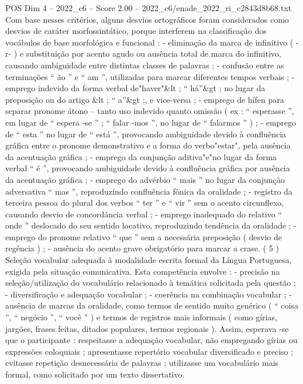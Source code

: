 \begin{textsample}{POS Dim 4 – 2022\_c6 – Score 2.00 – 2022\_c6/enade\_2022\_ri\_c2843d8b68.txt}
Com base nesses critérios, alguns desvios ortográficos foram considerados como desvios de caráter morfossintático, porque interferem na classificação dos vocábulos de base morfológica e funcional : - eliminação da marca de infinitivo ( -r- ) e substituição por acento agudo ou ausência total de marca do infinitivo, causando ambiguidade entre distintas classes de palavras ; - confusão entre as terminações “ ão ” e “ am ”, utilizadas para marcar diferentes tempos verbais ; - emprego indevido da forma verbal de"haver"\&lt ; “ há”\&gt ; no lugar da preposição ou do artigo \&lt ; “ a”\&gt ;, e vice-versa ; - emprego de hífen para separar pronome átono – tanto uso indevido quanto omissão ( ex : “ esperasse ”, em lugar de “ espera -se ” ; “ falar -mos ”, no lugar de “ falarmos ” ) ; - emprego de “ esta ” no lugar de “ está ”, provocando ambiguidade devido à confluência gráfica entre o pronome demonstrativo e a forma do verbo"estar", pela ausência da acentuação gráfica ; - emprego da conjunção aditiva"e"no lugar da forma verbal “ é ”, provocando ambiguidade devido à confluência gráfica por ausência da acentuação gráfica ; - emprego do advérbio “ mais ” no lugar da conjunção adversativa “ mas ”, reproduzindo confluência fônica da oralidade ; - registro da terceira pessoa do plural dos verbos “ ter ” e “ vir ” sem o acento circunflexo, causando desvio de concordância verbal ; - emprego inadequado do relativo “ onde ” deslocado do seu sentido locativo, reproduzindo tendência da oralidade ; - emprego do pronome relativo “ que ” sem a necessária preposição ( desvio de regência ) ; - ausência do acento grave obrigatório para marcar a crase. ( 5 ) Seleção vocabular adequada à modalidade escrita formal da Língua Portuguesa, exigida pela situação comunicativa.
Esta competência envolve : - precisão na seleção/utilização do vocabulário relacionado à temática solicitada pela questão ; - diversificação e adequação vocabular ; - coerência na combinação vocabular ; - ausência de marcas da oralidade, como termos de sentido muito genérico ( “ coisa ”, “ negócio ”, “ você ” ) e termos de registros mais informais ( como gírias, jargões, frases feitas, ditados populares, termos regionais ).
Assim, esperava -se que o participante : respeitasse a adequação vocabular, não empregando gírias ou expressões coloquiais ; apresentasse repertório vocabular diversificado e preciso ; evitasse repetição desnecessária de palavras ; utilizasse um vocabulário mais formal, como solicitado por um texto dissertativo.

\end{textsample}
